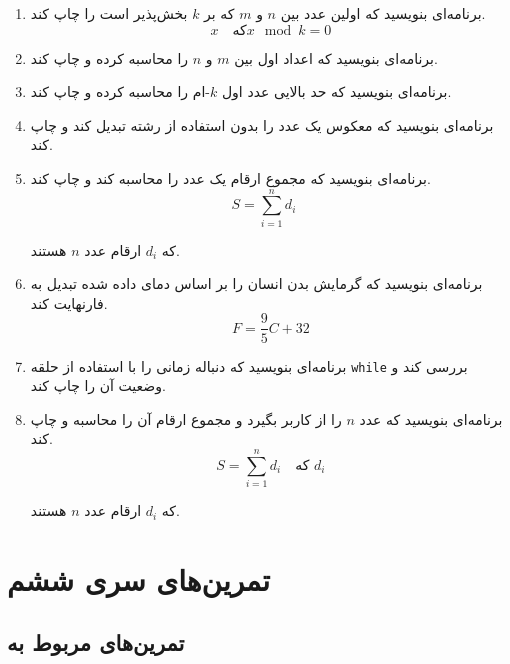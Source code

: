 \documentclass[a4paper,12pt]{article}
\begin{document}
\begin{enumerate}
		\item برنامه‌ای بنویسید که اولین عدد بین \(n\) و \(m\) که بر \(k\) بخش‌پذیر است را چاپ کند.
		\[
		x \quad \text{که} x \mod k = 0
		\]
		
		\item برنامه‌ای بنویسید که اعداد اول بین \(m\) و \(n\) را محاسبه کرده و چاپ کند.
		
		\item برنامه‌ای بنویسید که حد بالایی عدد اول \(k\)-ام را محاسبه کرده و چاپ کند.
		
		\item برنامه‌ای بنویسید که معکوس یک عدد را بدون استفاده از رشته تبدیل کند و چاپ کند.
		
		\item برنامه‌ای بنویسید که مجموع ارقام یک عدد را محاسبه کند و چاپ کند.
		\[
		S = \sum_{i=1}^{n} d_i \quad
		\]
		
		
		\begin{center}
			که \( d_i \) ارقام عدد \( n \) هستند.
		\end{center}
		
		
		\item برنامه‌ای بنویسید که گرمایش بدن انسان را بر اساس دمای داده شده تبدیل به فارنهایت کند.
		\[
		F = \frac{9}{5}C + 32
		\]
		
		\item برنامه‌ای بنویسید که دنباله زمانی را با استفاده از حلقه \texttt{while} بررسی کند و وضعیت آن را چاپ کند.
		
		\item 	برنامه‌ای بنویسید که عدد \(n\) را از کاربر بگیرد و مجموع ارقام آن را محاسبه و چاپ کند.
		\[
		S = \sum_{i=1}^{n} d_i \quad \text{که } d_i
		\]
		
		\begin{center}
			که \( d_i \) ارقام عدد \( n \) هستند.
		\end{center}
		
		
	\end{enumerate}
	
	
	
	\newpage
	\section*{تمرین‌های سری ششم}
	
	\subsection*{تمرین‌های مربوط به }
	
\end{document}
